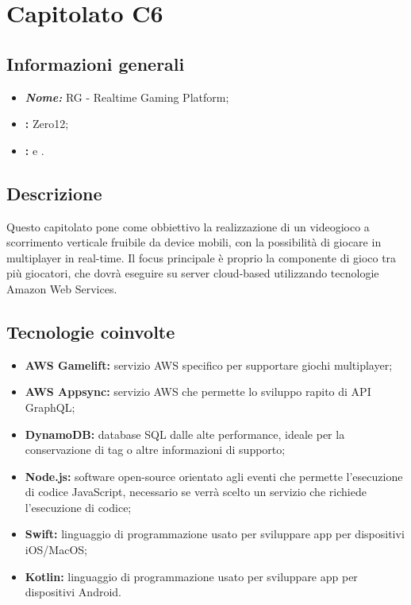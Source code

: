 \section{Capitolato C6}

\subsection{Informazioni generali}
\begin{itemize}
\item \textbf{\emph{Nome:}} RG - Realtime Gaming Platform;
\item \textbf{\commitProg:} Zero12;
\item \textbf{\proponProg:} \VT{} e \CR.
\end{itemize}

\subsection{Descrizione}
Questo capitolato pone come obbiettivo la realizzazione di un videogioco a scorrimento verticale fruibile da device mobili, con la possibilità di giocare in multiplayer in real-time. Il focus principale è proprio la componente di gioco tra più giocatori, che dovrà eseguire su server cloud-based utilizzando tecnologie Amazon Web Services.

\subsection{Tecnologie coinvolte}
\begin{itemize}
\item \textbf{AWS Gamelift:} servizio AWS specifico per supportare giochi multiplayer;
\item \textbf{AWS Appsync:} servizio AWS che permette lo sviluppo rapito di API GraphQL;
\item \textbf{DynamoDB:} database SQL dalle alte performance, ideale per la conservazione di tag o altre informazioni di supporto;
\item \textbf{Node.js:} software open-source orientato agli eventi che permette l'esecuzione di codice JavaScript, necessario se verrà scelto un servizio che richiede l'esecuzione di codice;
\item \textbf{Swift:} linguaggio di programmazione usato per sviluppare app per dispositivi iOS/MacOS;
\item \textbf{Kotlin:} linguaggio di programmazione usato per sviluppare app per dispositivi Android.
\end{itemize}

